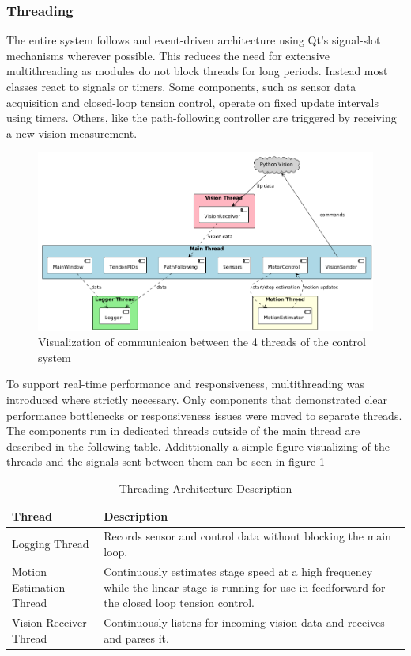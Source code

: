 \subsubsection{Threading}
The entire system follows and event-driven architecture using Qt's signal-slot mechanisms wherever possible. This reduces the need for extensive multithreading as modules do not block threads for long periods. Instead most classes react to signals or timers. Some components, such as sensor data acquisition and closed-loop tension control, operate on fixed update intervals using timers. Others, like the path-following controller are triggered by receiving a new vision measurement.
\begin{figure} [h]
    \centering
    \includegraphics[width=0.95\linewidth]{images/Software documentation/threads.png}
    \caption{Visualization of communicaion between the 4 threads of the control system}
    \label{fig:threads}
\end{figure}
To support real-time performance and responsiveness, multithreading was introduced where strictly necessary. Only components that demonstrated clear performance bottlenecks or responsiveness issues were moved to separate threads. The components run in dedicated threads outside of the main thread are described in the following table. Addittionally a simple figure visualizing of the threads and the signals sent between them can be seen in figure \ref{fig:threads}

\begin{table}[htbp]
\centering
\caption{Threading Architecture Description}
\begin{tabular}{p{}p{}}
\toprule
\textbf{Thread} & \textbf{Description} \\
\midrule
Logging Thread & Records sensor and control data without blocking the main loop. \\
\addlinespace
Motion Estimation Thread & Continuously estimates stage speed at a high frequency while the linear stage is running for use in feedforward for the closed loop tension control. \\
\addlinespace
Vision Receiver Thread & Continuously listens for incoming vision data and receives and parses it. \\
\bottomrule
\end{tabular}
\end{table}

